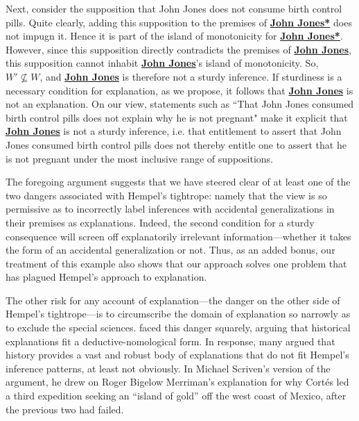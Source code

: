 \documentclass[natbib]{svjour3}                     %
\begin{document}
\noindent Next, consider the supposition that John Jones does not consume birth control pills. Quite clearly, adding this supposition to the premises of \hyperref[JohnJones*]{\textbf{John Jones*}} does not impugn it. Hence it is part of the island of monotonicity for \hyperref[JohnJones*]{\textbf{John Jones*}}. However, since this supposition directly contradicts the premises of \hyperref[JohnJones]{\textbf{John Jones}},  this supposition cannot inhabit \hyperref[JohnJones]{\textbf{John Jones}}'s island of monotonicity. So,  $ W'\not\subseteq W $, and \hyperref[JohnJones]{\textbf{John Jones}} is therefore not a sturdy inference. If sturdiness is a necessary condition for explanation, as we propose, it follows that \hyperref[JohnJones]{\textbf{John Jones}} is not an explanation. On our view, statements such as ``That John Jones consumed birth control pills does not explain why he is not pregnant" make it explicit that \hyperref[JohnJones]{\textbf{John Jones}} is not a sturdy inference, i.e. that entitlement to assert that John Jones consumed birth control pills does not thereby entitle one to assert that he is not pregnant under the most inclusive range of suppositions.

The foregoing argument suggests that we have steered clear of at least one of the two dangers associated with Hempel's tightrope: namely that the view is so permissive as to incorrectly label inferences with accidental generalizations in their premises as explanations. Indeed, the second condition for a sturdy consequence will screen off explanatorily irrelevant information---whether it takes the form of an accidental generalization or not. Thus, as an added bonus, our treatment of this example also shows that our approach solves one problem that has plagued Hempel's approach to explanation. 

The other risk for any account of explanation---the danger on the other side of Hempel's tightrope---is to circumscribe the domain of explanation so narrowly as to exclude the special sciences.  \cite{Hempel1942} faced this danger squarely,  arguing that historical explanations fit a deductive-nomological form.  In response, many argued that history provides a vast and robust body of explanations that do not fit Hempel's inference patterns, at least not obviously.  In Michael Scriven's \citeyearpar{Scriven1959a} version of the argument, he drew on Roger Bigelow Merriman's \citeyearpar{Merriman1918} explanation for why Cort\'{e}s led a third expedition seeking an ``island of gold'' off the west coast of Mexico, after the previous two had failed. 
\end{document}
